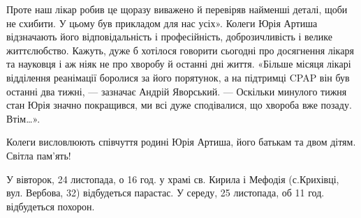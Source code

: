 Проте наш лікар робив це щоразу виважено й  перевіряв найменші деталі, щоби не
схибити. У цьому був прикладом для нас усіх». Колеги Юрія Артиша відзначають
його відповідальність і професійність, доброзичливість і велике життєлюбство.
Кажуть, дуже б хотілося говорити сьогодні про досягнення лікаря та науковця і
аж ніяк не про хворобу й останні дні життя. «Більше місяця лікарі відділення
реанімації боролися за його порятунок, а на підтримці CPAP він був останні два
тижні, --- зазначає Андрій Яворський. --- Оскільки минулого тижня стан Юрія значно
покращився, ми всі дуже сподівалися, що хвороба вже позаду. Втім…».   

Колеги висловлюють співчуття родині Юрія Артиша, його батькам та двом дітям.
Світла пам’ять!

У вівторок, 24  листопада, о 16 год. у храмі св. Кирила і Мефодія (с.Крихівці,
вул. Вербова, 32) відбудеться парастас. У середу, 25 листопада, об 11 год.
відбудеться похорон.
